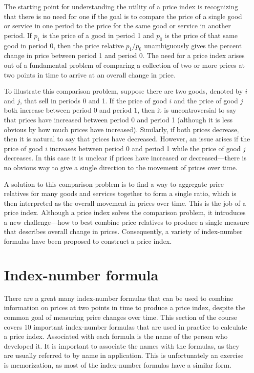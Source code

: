 \documentclass[]{article}
\begin{document}
The starting point for understanding the utility of a price index is recognizing that there is no need for one if the goal is to compare the price of a single good or service in one period to the price for the same good or service in another period. If \(p_1\) is the price of a good in period 1 and \(p_0\) is the price of that same good in period 0, then the price relative \(p_1/p_0\) unambiguously gives the percent change in price between period 1 and period 0. The need for a price index arises out of a fundamental problem of comparing a collection of two or more prices at two points in time to arrive at an overall change in price.

To illustrate this comparison problem, suppose there are two goods, denoted by \(i\) and \(j\), that sell in periods 0 and 1. If the price of good \(i\) and the price of good \(j\) both increase between period 0 and period 1, then it is uncontroversial to say that prices have increased between period 0 and period 1 (although it is less obvious by how much prices have increased). Similarly, if both prices decrease, then it is natural to say that prices have decreased. However, an issue arises if the price of good \(i\) increases between period 0 and
period 1 while the price of good \(j\) decreases. In this case it is unclear if prices have increased or decreased---there is no obvious way to give a single direction to the movement of prices over time.

A solution to this comparison problem is to find a way to aggregate price relatives for many goods and services together to form a single ratio, which is then interpreted as the overall movement in prices over time. This is the job of a price index. Although a price index solves the comparison problem, it introduces a new challenge---how to best combine price relatives to produce a single measure that describes overall change in prices. Consequently, a variety of index-number formulas have been proposed to construct a price index.

\hypertarget{index-number-formula}{%
\section{Index-number formula}\label{index-number-formula}}

There are a great many index-number formulas that can be used to combine information on prices at two points in time to produce a price index, despite the common goal of measuring price changes over time. This section of the course covers 10 important index-number formulas that are used in practice to calculate a price index. Associated with each formula is the name of the person who developed it. It is important to associate the names with the formulas, as they are usually referred to by name in application. This is unfortunately an exercise is memorization, as most of the index-number formulas have a similar form.
\end{document}
